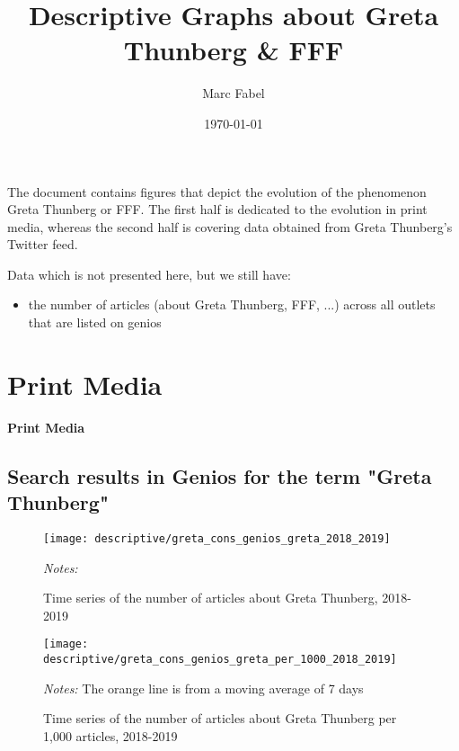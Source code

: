 \documentclass[11pt, a4paper]{article} %
\title{Descriptive Graphs about Greta Thunberg \& FFF}
\author{Marc Fabel}
\date{\monthyeardate\today}
\begin{document}
\maketitle
The document contains figures that depict the evolution of the phenomenon Greta Thunberg or FFF. The first half is dedicated to the evolution in print media, whereas the second half is covering data obtained from Greta Thunberg's Twitter feed.\newline

Data which is not presented here, but we still have: 
\begin{itemize}
	\item the number of articles (about Greta Thunberg, FFF, ...) across all outlets that are listed on genios
\end{itemize}

\tableofcontents


\newpage
\TODO\section{Print Media}
\vspace*{\fill}
{\Huge \begin{center}\textbf{Print Media}\end{center}}
\vspace*{\fill}\clearpage


\subsection{Search results in Genios for the term "Greta Thunberg"}


\begin{figure}[H]\centering
	\caption{Time series of the number of articles about Greta Thunberg, 2018-2019}
	\texttt{[image: descriptive/greta\_cons\_genios\_greta\_2018\_2019]}
	\begin{minipage}{\linewidth}
		\scriptsize{\emph{Notes:} }
	\end{minipage}
\end{figure}
\begin{figure}[H]\centering
	\caption{Time series of the number of articles about Greta Thunberg per 1,000 articles, 2018-2019}
	\texttt{[image: descriptive/greta\_cons\_genios\_greta\_per\_1000\_2018\_2019]}
	\begin{minipage}{\linewidth}
		\scriptsize{\emph{Notes:} The orange line is from a moving average of 7 days}
	\end{minipage}
\end{figure}
\end{document}
